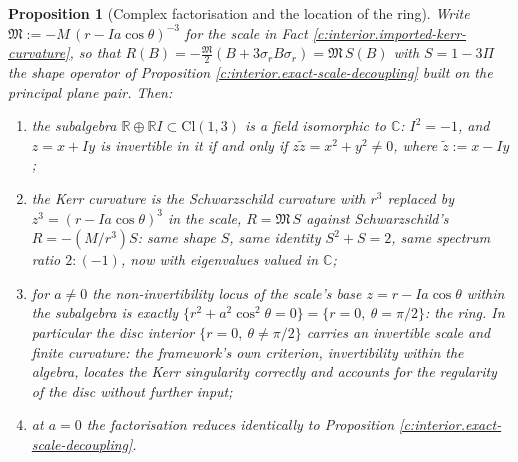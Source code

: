 \documentclass[11pt]{article}
\newtheorem{proposition}[theorem]{Proposition}
\theoremstyle{definition}
\theoremstyle{plain}
\providecommand{\C}{}\renewcommand{\C}{\mathbb{C}}
\providecommand{\Cl}{}\renewcommand{\Cl}{\mathrm{Cl}}
\providecommand{\R}{}\renewcommand{\R}{\mathbb{R}}
\begin{document}
\begin{proposition}[Complex factorisation and the location of the ring]\label{c:interior.complex-factorisation-location-ring}
Write $\mathfrak{M} := -M\,(r - Ia\cos\theta)^{-3}$ for the scale in Fact \ref{c:interior.imported-kerr-curvature}, so that $R(B) = -\tfrac{\mathfrak M}{2}(B + 3\sigma_rB\sigma_r) = \mathfrak{M}\,S(B)$ with $S = 1 - 3\Pi$ the shape operator of Proposition \ref{c:interior.exact-scale-decoupling} built on the principal plane pair. Then:
\begin{enumerate}
\item the subalgebra $\R \oplus \R I \subset \Cl(1,3)$ is a field isomorphic to $\C$: $I^2 = -1$, and $z = x + Iy$ is invertible in it if and only if $z\tilde z = x^2 + y^2 \neq 0$, where $\tilde z := x - Iy$;
\item the Kerr curvature is the Schwarzschild curvature with $r^3$ replaced by $z^3 = (r - Ia\cos\theta)^3$ in the scale, $R = \mathfrak M\,S$ against Schwarzschild's $R = -(M/r^3)S$: same shape $S$, same identity $S^2 + S = 2$, same spectrum ratio $2{:}(-1)$, now with eigenvalues valued in $\C$;
\item for $a \neq 0$ the non-invertibility locus of the scale's base $z = r - Ia\cos\theta$ within the subalgebra is exactly $\{r^2 + a^2\cos^2\theta = 0\} = \{r = 0,\ \theta = \pi/2\}$: the ring. In particular the disc interior $\{r = 0,\ \theta \neq \pi/2\}$ carries an invertible scale and finite curvature: the framework's own criterion, invertibility within the algebra, locates the Kerr singularity correctly and accounts for the regularity of the disc without further input;
\item at $a = 0$ the factorisation reduces identically to Proposition \ref{c:interior.exact-scale-decoupling}.
\end{enumerate}
\end{proposition}
\end{document}
